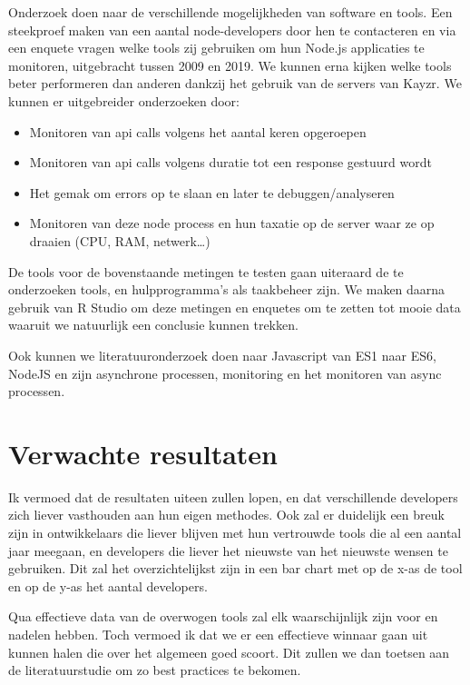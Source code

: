 Onderzoek doen naar de verschillende mogelijkheden van software en tools. Een steekproef maken van een aantal node-developers door hen te contacteren en via een enquete vragen welke tools zij gebruiken om hun Node.js applicaties te monitoren, uitgebracht tussen 2009 en 2019. We kunnen erna kijken welke tools beter performeren dan anderen dankzij het gebruik van de servers van Kayzr. We kunnen er uitgebreider onderzoeken door:

\begin{itemize}
	\item Monitoren van api calls volgens het aantal keren opgeroepen
	\item Monitoren van api calls volgens duratie tot een response gestuurd wordt
	\item Het gemak om errors op te slaan en later te debuggen/analyseren
	\item Monitoren van deze node process en hun taxatie op de server waar ze op draaien (CPU, RAM, netwerk…)
\end{itemize}

De tools voor de bovenstaande metingen te testen gaan uiteraard de te onderzoeken tools, en hulpprogramma's als taakbeheer zijn. We maken daarna gebruik van R Studio om deze metingen en enquetes om te zetten tot mooie data waaruit we natuurlijk een conclusie kunnen trekken. 

Ook kunnen we literatuuronderzoek doen naar Javascript van ES1 naar ES6, NodeJS en zijn asynchrone processen, monitoring en het monitoren van async processen. 

\section{Verwachte resultaten}
\label{sec:verwachte_resultaten}

Ik vermoed dat de resultaten uiteen zullen lopen, en dat verschillende developers zich liever vasthouden aan hun eigen methodes. Ook zal er duidelijk een breuk zijn in ontwikkelaars die liever blijven met hun vertrouwde tools die al een aantal jaar meegaan, en developers die liever het nieuwste van het nieuwste wensen te gebruiken. Dit zal het overzichtelijkst zijn in een bar chart met op de x-as de tool en op de y-as het aantal developers.

Qua effectieve data van de overwogen tools zal elk waarschijnlijk zijn voor en nadelen hebben. Toch vermoed ik dat we er een effectieve winnaar gaan uit kunnen halen die over het algemeen goed scoort. Dit zullen we dan toetsen aan de literatuurstudie om zo best practices te bekomen.

